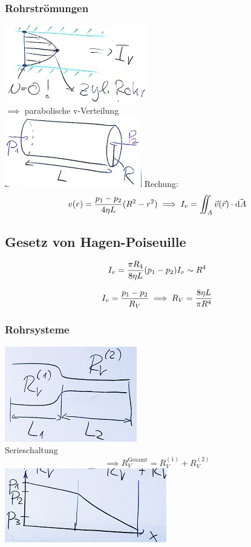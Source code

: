 \subsubsection{Rohrströmungen}
\includegraphics{Bild91} \\
$\implies$ parabolische v-Verteilung \\
\includegraphics{Bild92}
Rechung:
\[
	v(r) = \frac{p_1 - p_2}{4 \eta L} (R^2 - r^2) \\
	\implies I_v = \iint_A \vec{v}(\vec{r}) \cdot \vec{\dd A}
\]

\subsection{Gesetz von Hagen-Poiseuille}
\[
	I_v = \frac{\pi R_4}{8 \eta L} (p_1 - p_2) \\
	I_v \sim R^4
\]
\begin{def*}[ note = Rohrwiderstand , index = Rohrwiderstand ]
	\[
		I_v = \frac{p_1 - p_2}{R_V} \\
		\implies R_V = \frac{8 \eta L}{\pi R^4}
	\]
\end{def*}

\subsubsection{Rohrsysteme}
\begin{bsp*}[ note = 2 Rohrstücke ]
	\includegraphics{Bild93} \\
	Serieschaltung
	\[ \implies R_V^{\text{Gesamt}} = R_V^{(1)} + R_V^{(2)} \]
	\includegraphics{Bild94}
\end{bsp*}

